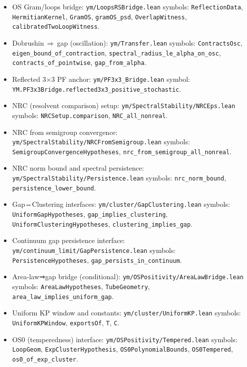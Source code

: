 \documentclass[11pt]{amsart}
\begin{document}
\begin{itemize}
  \item OS Gram/loops bridge: \texttt{ym/LoopsRSBridge.lean}\;\; symbols: \texttt{ReflectionData}, \texttt{HermitianKernel}, \texttt{GramOS}, \texttt{gramOS\_psd}, \texttt{OverlapWitness}, \texttt{calibratedTwoLoopWitness}.
  \item Dobrushin\,$\Rightarrow$\,gap (oscillation): \texttt{ym/Transfer.lean}\;\; symbols: \texttt{ContractsOsc}, \texttt{eigen\_bound\_of\_contraction}, \texttt{spectral\_radius\_le\_alpha\_on\_osc}, \texttt{contracts\_of\_pointwise}, \texttt{gap\_from\_alpha}.
  \item Reflected 3×3 PF anchor: \texttt{ym/PF3x3\_Bridge.lean}\;\; symbol: \texttt{YM.PF3x3Bridge.reflected3x3\_positive\_stochastic}.
  \item NRC (resolvent comparison) setup: \texttt{ym/SpectralStability/NRCEps.lean}\;\; symbols: \texttt{NRCSetup.comparison}, \texttt{NRC\_all\_nonreal}.
  \item NRC from semigroup convergence: \texttt{ym/SpectralStability/NRCFromSemigroup.lean}\;\; symbols: \texttt{SemigroupConvergenceHypotheses}, \texttt{nrc\_from\_semigroup\_all\_nonreal}.
  \item NRC norm bound and spectral persistence: \texttt{ym/SpectralStability/Persistence.lean}\;\; symbols: \texttt{nrc\_norm\_bound}, \texttt{persistence\_lower\_bound}.
  \item Gap⇔Clustering interfaces: \texttt{ym/cluster/GapClustering.lean}\;\; symbols: \texttt{UniformGapHypotheses}, \texttt{gap\_implies\_clustering}, \texttt{UniformClusteringHypotheses}, \texttt{clustering\_implies\_gap}.
  \item Continuum gap persistence interface: \texttt{ym/continuum\_limit/GapPersistence.lean}\;\; symbols: \texttt{PersistenceHypotheses}, \texttt{gap\_persists\_in\_continuum}.
  \item Area-law⇒gap bridge (conditional): \texttt{ym/OSPositivity/AreaLawBridge.lean}\;\; symbols: \texttt{AreaLawHypotheses}, \texttt{TubeGeometry}, \texttt{area\_law\_implies\_uniform\_gap}.
  \item Uniform KP window and constants: \texttt{ym/cluster/UniformKP.lean}\;\; symbols: \texttt{UniformKPWindow}, \texttt{exportsOf}, \texttt{T}, \texttt{C}.
  \item OS0 (temperedness) interface: \texttt{ym/OSPositivity/Tempered.lean}\;\; symbols: \texttt{LoopGeom}, \texttt{ExpClusterHypothesis}, \texttt{OS0PolynomialBounds}, \texttt{OS0Tempered}, \texttt{os0\_of\_exp\_cluster}.

\end{itemize}
\end{document}
